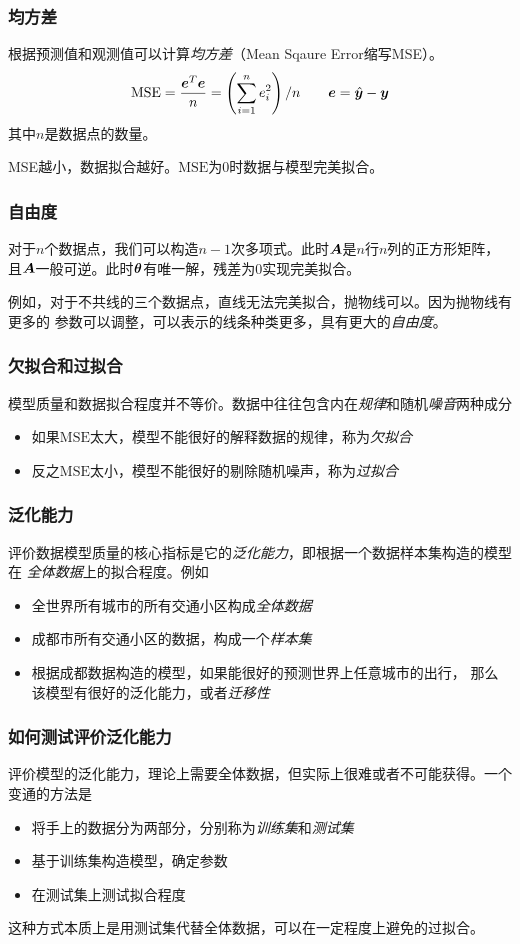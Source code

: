\documentclass[14pt]{beamer}
\begin{document}
    \begin{frame}
        \frametitle{均方差}
        根据预测值和观测值可以计算\emph{均方差}（Mean Sqaure Error缩写MSE）。
        \[\text{MSE}=\frac{\bm{e}^T\bm{e}}{n}=\left(\sum_{i=1}^{n}e_i^2\right)/n
         \qquad \bm{e}=\hat{\bm{y}}-\bm{y}\]
        其中$n$是数据点的数量。

        MSE越小，数据拟合越好。$\text{MSE}$为$0$时数据与模型完美拟合。
    \end{frame}

    \begin{frame}
        \frametitle{自由度}
        对于$n$个数据点，我们可以构造$n-1$次多项式。此时$\bm{A}$是$n$行$n$列的正方形矩阵，
        且$\bm{A}$一般可逆。此时$\bm{\theta}$有唯一解，残差为$0$实现完美拟合。

        例如，对于不共线的三个数据点，直线无法完美拟合，抛物线可以。因为抛物线有更多的
        参数可以调整，可以表示的线条种类更多，具有更大的\emph{自由度}。
    \end{frame}

    \begin{frame}
        \frametitle{欠拟合和过拟合}
        模型质量和数据拟合程度并不等价。数据中往往包含内在\emph{规律}和随机\emph{噪音}两种成分
        \begin{itemize}
            \item 如果$\text{MSE}$太大，模型不能很好的解释数据的规律，称为\emph{欠拟合}
            \item 反之$\text{MSE}$太小，模型不能很好的剔除随机噪声，称为\emph{过拟合}
        \end{itemize}
    \end{frame}

    \begin{frame}
        \frametitle{泛化能力}
        评价数据模型质量的核心指标是它的\emph{泛化能力}，即根据一个数据样本集构造的模型在
        \emph{全体数据}上的拟合程度。例如
        \begin{itemize}
            \item 全世界所有城市的所有交通小区构成\emph{全体数据}
            \item 成都市所有交通小区的数据，构成一个\emph{样本集}
            \item 根据成都数据构造的模型，如果能很好的预测世界上任意城市的出行，
            那么该模型有很好的泛化能力，或者\emph{迁移性}
        \end{itemize}
    \end{frame}

    \begin{frame}
        \frametitle{如何测试评价泛化能力}
        评价模型的泛化能力，理论上需要全体数据，但实际上很难或者不可能获得。一个变通的方法是
        \begin{itemize}
            \item 将手上的数据分为两部分，分别称为\emph{训练集}和\emph{测试集}
            \item 基于训练集构造模型，确定参数
            \item 在测试集上测试拟合程度
        \end{itemize}

        这种方式本质上是用测试集代替全体数据，可以在一定程度上避免的过拟合。
    \end{frame}
\end{document}
